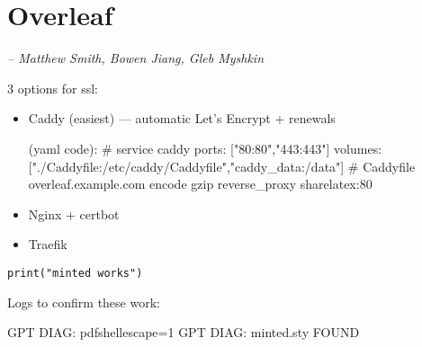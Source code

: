 \chapter{Overleaf}
\small{\textit{-- Matthew Smith, Bowen Jiang, Gleb Myshkin}}
\label{Chapter::Overleaf}


3 options for ssl:

\begin{itemize}
        \item Caddy (easiest) — automatic Let’s Encrypt + renewals

        (yaml code): # service caddy
        ports: ["80:80","443:443"]
        volumes: ["./Caddyfile:/etc/caddy/Caddyfile","caddy_data:/data"]
        # Caddyfile
        overleaf.example.com {
          encode gzip
          reverse_proxy sharelatex:80
        }
        \item Nginx + certbot
        \item Traefik
    \end{itemize}

\begin{verbatim}
print("minted works")
\end{verbatim}


Logs to confirm these work:

GPT DIAG: pdfshellescape=1
GPT DIAG: minted.sty FOUND

